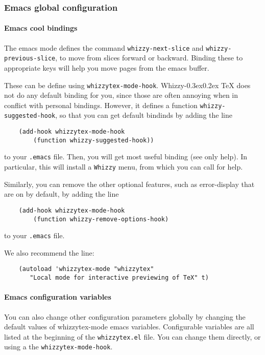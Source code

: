 \documentclass{article}
\let \lst \verb
\def \whizzy{{Whizzy\kern -0.3ex\raise 0.2ex \hbox{\TeX}}}
\begin{document}
\subsubsection {Emacs global configuration}

\paragraph {Emacs cool bindings}

The emacs mode defines the command \lst"whizzy-next-slice" and
\lst"whizzy-previous-slice", to move from slices forward or backward.
Binding these to appropriate keys will help you move pages from the emacs
buffer. 

These can be define using \lst"whizzytex-mode-hook". 
{\whizzy} does not do any default binding for you, since those are often
annoying when in conflict with personal bindings. 
However, it defines a function \lst"whizzy-suggested-hook", so that you can
get default bindinds by adding the line
\begin{verbatim}
    (add-hook whizzytex-mode-hook 
        (function whizzy-suggested-hook))
\end{verbatim}
to your \lst".emacs" file. 
Then, you will get most useful binding (see only help). 
In particular, this will install a \lst"Whizzy" menu, from which you can
call for help.

Similarly, you can remove the other optional features, 
such as error-display that are on by default, by adding the line
\begin{verbatim}
    (add-hook whizzytex-mode-hook 
        (function whizzy-remove-options-hook)
\end{verbatim}
to your \lst".emacs" file.

We also recommend the line:
\begin{verbatim}
    (autoload 'whizzytex-mode "whizzytex" 
       "Local mode for interactive previewing of TeX" t)
\end{verbatim}

\paragraph {Emacs configuration variables}

You can also change other configuration parameters globally by changing the
default values of whizzytex-mode emacs variables. 
Configurable variables are all listed at the beginning of the
\lst"whizzytex.el" file. You can change them directly, or using a 
the \lst"whizzytex-mode-hook". 
\end{document}
